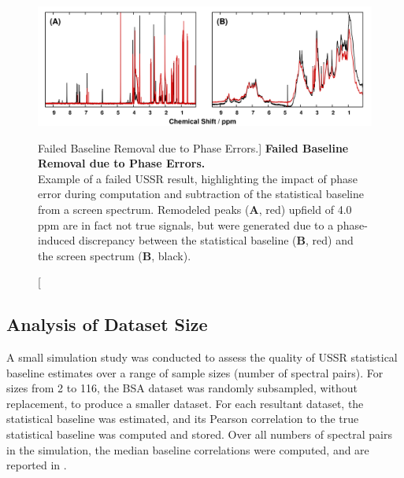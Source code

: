 \begin{figure}[ht!]
\includegraphics[width=6in]{figs/ussr/03-ussrfail.png}
\caption
      [Failed Baseline Removal due to Phase Errors.]{
  {\bf Failed Baseline Removal due to Phase Errors.}
  \\
  Example of a failed USSR result, highlighting the impact of phase error
  during computation and subtraction of the statistical baseline from a screen
  spectrum. Remodeled peaks ({\bf A}, red) upfield of 4.0 ppm are in fact not
  true signals, but were generated due to a phase-induced discrepancy between
  the statistical baseline ({\bf B}, red) and the screen spectrum
  ({\bf B}, black).
}
\label{figure.7.3}
\end{figure}

\subsection{Analysis of Dataset Size}

\begin{doublespace}
A small simulation study was conducted to assess the quality of USSR
statistical baseline estimates over a range of sample sizes (number of spectral
pairs). For sizes from 2 to 116, the BSA dataset was randomly subsampled,
without replacement, to produce a smaller dataset. For each resultant dataset,
the statistical baseline was estimated, and its Pearson correlation to the true
statistical baseline was computed and stored. Over all numbers of spectral
pairs in the simulation, the median baseline correlations were computed, and
are reported in .
\end{doublespace}

